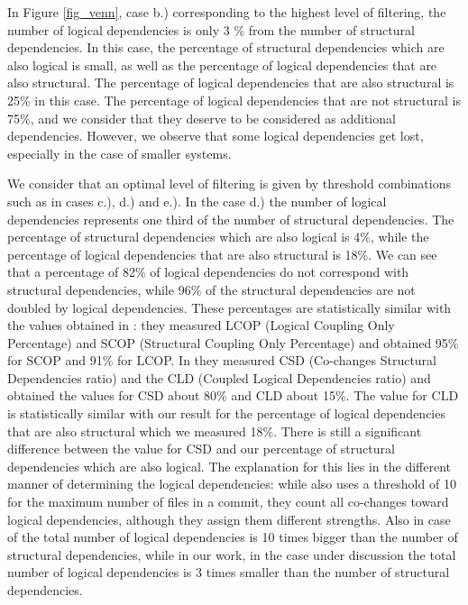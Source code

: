 \documentclass[conference]{IEEEtran}
\begin{document}
In Figure \ref{fig_venn}, case b.) corresponding to the highest level of filtering, the number of logical dependencies is only 3 \% from  the number of structural dependencies. In this case, the percentage of structural dependencies which are also logical is small, as well as the percentage of logical dependencies that are also structural.  The percentage of logical dependencies that are also structural is 25\% in this case. The percentage of logical dependencies that are not structural is 75\%, and we consider that they deserve to be considered as additional dependencies. However, we observe that some logical dependencies get lost, especially in the case of smaller systems.

We consider that an optimal level of filtering is given by threshold combinations such as in cases c.), d.) and e.).  In the case d.) the number of logical dependencies represents one third of the number of structural dependencies. The percentage of structural dependencies which are also logical is 4\%,  while the percentage of logical dependencies that are also structural is 18\%. We can see that a percentage of 82\% of logical dependencies do not correspond with  structural dependencies, while 96\% of the structural dependencies are not doubled by logical dependencies. These percentages are statistically similar with the values obtained in \cite{Oliva:2011:ISL:2067853.2068086}: they measured LCOP (Logical Coupling Only Percentage)  and SCOP (Structural Coupling Only Percentage) and obtained 95\% for SCOP and 91\% for LCOP. In \cite{DBLP:journals/jss/AjienkaC17} they  measured CSD (Co-changes Structural Dependencies ratio) and the CLD (Coupled Logical Dependencies ratio) and obtained the values for CSD about 80\% and CLD about 15\%. The value for CLD is statistically similar with our result for the percentage of logical dependencies that are also structural which we measured 18\%. There is still a significant difference between the value for CSD and our percentage of structural dependencies which are also logical. The explanation for this lies in the different manner of determining the logical dependencies: while \cite{DBLP:journals/jss/AjienkaC17} also uses a threshold of 10 for the maximum number of files in a commit, they count all co-changes toward logical dependencies, although they assign them different strengths. Also in case of \cite{DBLP:journals/jss/AjienkaC17}  the total number of logical dependencies is 10 times bigger than the number of structural dependencies, while in our work, in the case under discussion the total number of logical dependencies is 3 times smaller than the number of structural dependencies.  
\end{document}
